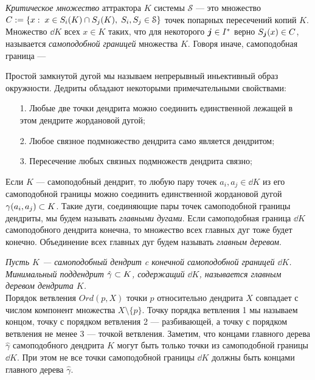 
{\em Критическое множество} аттрактора $K$ системы $\mathcal{S}$ --- это множество $C:=\{x:\; x\in S_i(K)\cap S_j(K),\; S_i, S_j\in{\EuScript S}\}$ точек попарных пересечений копий $K$. 
Множество $\dd K$ всех $x\in K$ таких, что для некоторого ${\bm{j}}\in I^*$ верно $S_{\bm{j}}(x)\in C$, называется {\em самоподобной границей} множества $K$.
Говоря иначе, самоподобная граница ---




Простой замкнутой дугой мы называем непрерывный иньективный образ окружности.
Дедриты обладают некоторыми примечательными свойствами:
\begin{enumerate}[nolistsep]
\item[1.] Любые две точки дендрита можно соединить единственной лежащей в этом дендрите жордановой дугой;
\item[2.] Любое связное подмножество дендрита само является дендритом;
\item[3.] Пересечение любых связных подмножеств дендрита связно;
\end{enumerate}

Если $K$ --- самоподобный дендрит, то любую пару точек $a_i,a_j\in\dd K$ из его самоподобной границы можно соединить единственной жордановой дугой $\gamma(a_i,a_j)\subset K$.
Такие дуги, соединяющие пары точек самоподобной границы дендриты, мы будем называть {\em главными дугами}.
Если самоподобная граница $\dd K$ самоподобного дендрита конечна, то множество всех главных дуг тоже будет конечно.
Объединение всех главных дуг будем называть {\em главным деревом}.

{\em Пусть $K$ --- самоподобный дендрит c конечной самоподобной границей $\dd K$. 
Минимальный поддендрит $\hat\gamma\subset K$, содержащий $\dd K$, называется {\em главным деревом} дендрита $K$.}\\

Порядок ветвления $Ord(p,X)$ точки $p$ относительно дендрита $X$ совпадает с числом компонент множества $X\setminus\{p\}$.
Точку порядка ветвления 1 мы называем концом, точку с порядком ветвления 2 --- разбивающей, а точку с порядком ветвления не менее 3 --- точкой ветвления.
Заметим, что концами главного дерева $\hat\gamma$ самоподобного дендрита $K$ могут быть только точки из самоподобной границы $\dd K$.
При этом не все точки самоподобной границы $\dd K$ должны быть концами главного дерева $\hat\gamma$.\\

